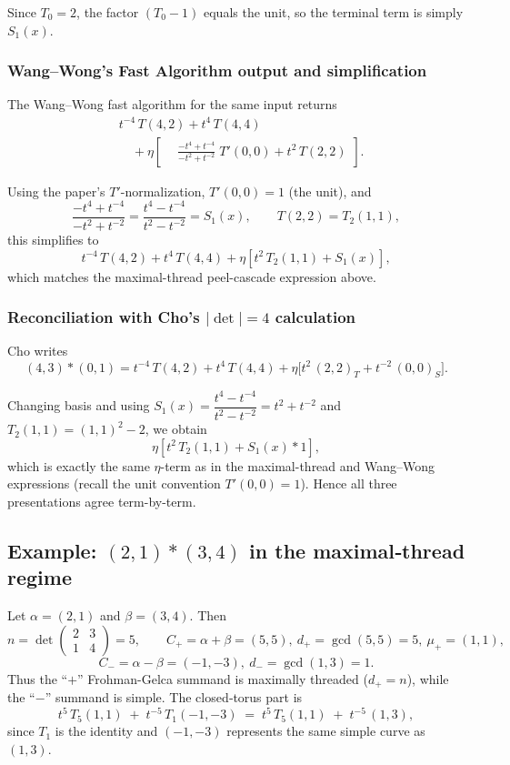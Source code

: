\documentclass[12pt]{article}
\begin{document}
Since $T_{0}=2$, the factor $(T_{0}-1)$ equals the unit, so the terminal term is simply $S_1(x)$.

\subsubsection*{Wang--Wong's Fast Algorithm output and simplification}

The Wang--Wong fast algorithm for the same input returns
\begin{align}
&t^{-4}\,T(4,2) + t^{4}\,T(4,4) \nonumber \\
&\quad + \eta\left[\begin{aligned}
&\frac{-t^{4}+t^{-4}}{-t^{2}+t^{-2}}\;T'(0,0) + t^{2}\,T(2,2)
\end{aligned}\right].
\end{align}

Using the paper's $T'$-normalization, $T'(0,0)=1$ (the unit), and
\[
\frac{-t^{4}+t^{-4}}{-t^{2}+t^{-2}} = \frac{t^{4}-t^{-4}}{t^{2}-t^{-2}} = S_1(x), \qquad T(2,2)=T_{2}(1,1),
\]
this simplifies to
\[
t^{-4}\,T(4,2)+t^{4}\,T(4,4) + \eta\left[ t^{2}\,T_{2}(1,1)+S_1(x)\right],
\]
which matches the maximal-thread peel-cascade expression above.

\subsubsection*{Reconciliation with Cho's \texorpdfstring{$|\det|=4$}{|det|=4} calculation}

Cho writes
\[
(4,3)\ast(0,1) = t^{-4}\,T(4,2)+t^{4}\,T(4,4) + \eta\big[t^{2}\,(2,2)_{T}+t^{-2}\,(0,0)_{S}\big].
\]

Changing basis and using $S_1(x)=\dfrac{t^{4}-t^{-4}}{t^{2}-t^{-2}}=t^{2}+t^{-2}$ and $T_{2}(1,1)=(1,1)^{2}-2$, we obtain
\[
\eta\left[t^{2}\,T_{2}(1,1) + S_1(x) \ast 1\right],
\]
which is exactly the same $\eta$-term as in the maximal-thread and Wang--Wong expressions (recall the unit convention $T'(0,0)=1$). Hence all three presentations agree term-by-term.




\subsection*{Example: \texorpdfstring{$(2,1)\ast(3,4)$}{(2,1)\ast(3,4)} in the maximal‑thread regime}
Let $\alpha=(2,1)$ and $\beta=(3,4)$. Then
\[
n=\det\!\begin{pmatrix}2&3\\ 1&4\end{pmatrix}=5,\qquad
C_{+}=\alpha+\beta=(5,5),\ d_{+}=\gcd(5,5)=5,\ \mu_{+}=(1,1),
\]
\[
C_{-}=\alpha-\beta=(-1,-3),\ d_{-}=\gcd(1,3)=1.
\]
Thus the “$+$” Frohman-Gelca summand is maximally threaded ($d_{+}=n$), while the “$-$” summand is simple. The closed‑torus part is
\[
t^{5}\,T_{5}(1,1)\;+\;t^{-5}\,T_{1}(-1,-3)
\;=\;t^{5}\,T_{5}(1,1)\;+\;t^{-5}\,(1,3),
\]
since $T_{1}$ is the identity and $(-1,-3)$ represents the same simple curve as $(1,3)$.
\end{document}

